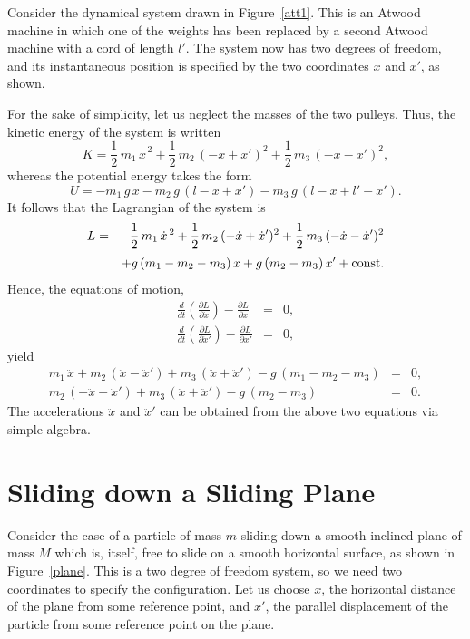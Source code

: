 Consider the dynamical system drawn in Figure~\ref{att1}. This is an Atwood
machine in which one of the weights has been replaced by a second
Atwood machine with a cord of length $l'$. The system now has two degrees of freedom, and
its instantaneous position is specified by the two coordinates $x$ and $x'$,
as shown. 

For the sake of simplicity, let us neglect the masses of the two pulleys.
Thus, the kinetic energy of the system is written
\begin{equation}
K = \frac{1}{2}\,m_1\,\dot{x}^{\,2} + \frac{1}{2}\,m_2\,(-\dot{x}+ \dot{x}')^2 + \frac{1}{2}\,m_3\,(-\dot{x} - \dot{x}')^2,
\end{equation}
whereas the potential energy takes the form
\begin{equation}
U = - m_1\,g\,x - m_2\,g\,(l-x+x')- m_3\,g\,(l-x+l'-x').
\end{equation}
It follows that the Lagrangian of the system is
\begin{eqnarray}
L &=& \frac{1}{2}\,m_1\,\dot{x}^{\,2} + \frac{1}{2}\,m_2\,(-\dot{x}+ \dot{x}')^2 + \frac{1}{2}\,m_3\,(-\dot{x} - \dot{x}')^2\nonumber\\[0.5ex]
&&+ g\,(m_1-m_2-m_3)\,x+g\,(m_2-m_3)\,x' + {\rm const}.
\end{eqnarray}
Hence, the equations of motion,
\begin{eqnarray}
\frac{d}{dt}\!\left(\frac{\partial L}{\partial\dot{x}}\right) - \frac{\partial L}{\partial x} &=& 0,\\[0.5ex]
\frac{d}{dt}\!\left(\frac{\partial L}{\partial\dot{x}'}\right) - \frac{\partial L}{\partial x'} &=& 0,
\end{eqnarray}
yield
\begin{eqnarray}
m_1\,\ddot{x} + m_2\,(\ddot{x}- \ddot{x}') + m_3\,(\ddot{x}+\ddot{x}')
- g\,(m_1-m_2-m_3) &=& 0,\\[0.5ex]
m_2\,(-\ddot{x} + \ddot{x}')+m_3\,(\ddot{x}+\ddot{x}') - g\,(m_2-m_3) &=& 0.
\end{eqnarray}
The accelerations $\ddot{x}$ and $\ddot{x}'$ can be obtained from
the above two equations via simple algebra.

\section{Sliding down a Sliding Plane}\label{s10.7}
Consider the case of a particle of mass $m$ sliding down a smooth
inclined plane of mass $M$ which is, itself, free to slide on
a smooth horizontal surface, as shown in Figure~\ref{plane}.
This is a two degree of freedom system, so we need two
coordinates to specify the configuration. Let us choose $x$,
the horizontal distance of the plane from some reference point, and
$x'$, the parallel displacement of the particle from some reference point
on the plane.


